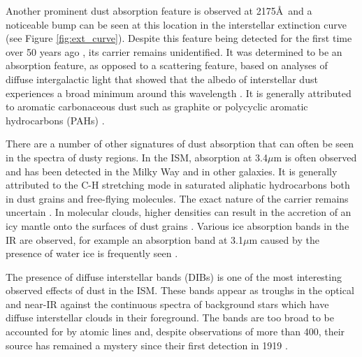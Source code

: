 Another prominent dust absorption feature  is observed at 2175\AA\ and a noticeable bump can be seen at this location in the interstellar extinction curve (see Figure \ref{fig:ext_curve}).  Despite this feature being detected for the first time over 50 years ago \citep{Stecher1965}, its carrier remains unidentified.  It was determined to be an absorption feature, as opposed to a scattering feature, based on analyses of diffuse intergalactic light that showed that the albedo of interstellar dust experiences a broad minimum around this wavelength \citep{Lillie1976,Witt1982,Witt1986}.  It is generally attributed to aromatic carbonaceous dust such as graphite \citep{Stecher1965a} or polycyclic aromatic hydrocarbons (PAHs) \citep{Joblin1992,Li2001}.

There are a number of other signatures of dust absorption that can often be seen in  the spectra of dusty regions.  In the ISM, absorption at 3.4$\mu$m is often observed and has been detected in the Milky Way and in other galaxies.  It is generally attributed to the C-H stretching mode in saturated aliphatic hydrocarbons both in dust grains and free-flying molecules.  The exact nature of the carrier remains uncertain \citep{Pendleton2002}. In molecular clouds, higher densities can result in the accretion of an icy mantle onto the surfaces of dust grains \citep{Schutte1997}.  Various ice absorption bands in the IR are observed, for example an absorption band at 3.1$\mu$m caused by the presence of water ice is frequently seen \citep{Ehrenfreund2000}.

The presence of diffuse interstellar bands (DIBs) is one of the most interesting observed effects of dust in the ISM.  These bands appear as troughs in the optical and near-IR against the continuous spectra of background stars which have diffuse interstellar clouds in their foreground.  The bands are too broad to be accounted for by atomic lines and, despite observations of more than 400, their source has remained a mystery since their first detection in 1919 \citep{Heger1922,Hobbs2008,Hobbs2009}.



